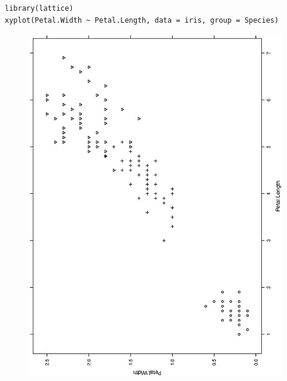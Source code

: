 \documentclass[captions=tableheading]{scrbook}
\begin{document}
\begin{verbatim}
library(lattice)
xyplot(Petal.Width ~ Petal.Length, data = iris, group = Species)
\end{verbatim}







\begin{figure}[th]
  \includegraphics[angle=270, totalheight=4in]{ps/datadesc/xyplot-group.ps}
  \caption{}
  \label{fig-xyplot-group}
\end{figure}
\end{document}
